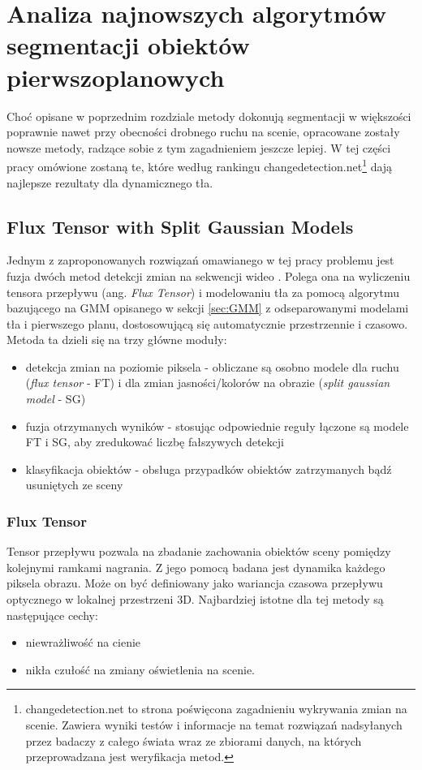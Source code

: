 \chapter{Analiza najnowszych algorytmów segmentacji obiektów pierwszoplanowych}
\label{cha:analiza}

Choć opisane w poprzednim rozdziale metody dokonują segmentacji w większości poprawnie nawet przy obecności drobnego ruchu na scenie, opracowane zostały nowsze metody, radzące sobie z tym zagadnieniem jeszcze lepiej. W tej części pracy omówione zostaną te, które według rankingu changedetection.net\footnote{changedetection.net to strona poświęcona zagadnieniu wykrywania zmian na scenie. Zawiera wyniki testów i informacje na temat rozwiązań nadsyłanych przez badaczy z całego świata wraz ze zbiorami danych, na których przeprowadzana jest weryfikacja metod.} dają najlepsze rezultaty dla dynamicznego tła. 


\section{Flux Tensor with Split Gaussian Models}
\label{sec:FTSG}

Jednym z zaproponowanych rozwiązań omawianego w tej pracy problemu jest fuzja dwóch metod detekcji zmian na sekwencji wideo \cite{6910016}. Polega ona na wyliczeniu tensora przepływu (ang. \textit{Flux Tensor}) i modelowaniu tła za pomocą algorytmu bazującego na GMM opisanego w sekcji \ref{sec:GMM} z odseparowanymi modelami tła i pierwszego planu, dostosowującą się automatycznie przestrzennie i czasowo.
Metoda ta dzieli się na trzy główne moduły:
\begin{itemize}
\item detekcja zmian na poziomie piksela - obliczane są osobno modele dla ruchu (\textit{flux tensor} - FT) i dla zmian jasności/kolorów na obrazie (\textit{split gaussian model} - SG)
\item fuzja otrzymanych wyników - stosując odpowiednie reguły łączone są modele FT i SG, aby zredukować liczbę fałszywych detekcji
\item klasyfikacja obiektów - obsługa przypadków obiektów zatrzymanych bądź usuniętych ze sceny
\end{itemize}
\subsection{Flux Tensor}
\label{sec:FT}
Tensor przepływu pozwala na zbadanie zachowania obiektów sceny pomiędzy kolejnymi ramkami nagrania. Z jego pomocą badana jest dynamika każdego piksela obrazu. Może on być definiowany jako wariancja czasowa przepływu optycznego w lokalnej przestrzeni 3D. Najbardziej istotne dla tej metody są następujące cechy:
\begin{itemize}
\item niewrażliwość na cienie
\item nikła czułość na zmiany oświetlenia na scenie.
\end{itemize} 
